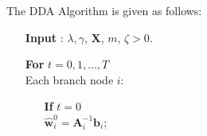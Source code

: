 \documentclass{article}
\begin{document}
The DDA Algorithm is given as follows:
\begin{itemize}
  \item[\textbf{Input}]: $\lambda,\gamma$, $\mathbf X$, $m$, $\zeta>0$.
  \item[\textbf{For}] $t=0, 1, \ldots, T$\\
  Each branch node $i$:
   \begin{itemize}
    \item[\textbf{If}]$t=0$\\
     $\hat{\mathbf w}_i^0=\mathbf A_i^{-1} \mathbf b_i$;
    \end{itemize}

\end{itemize}
\end{document}
